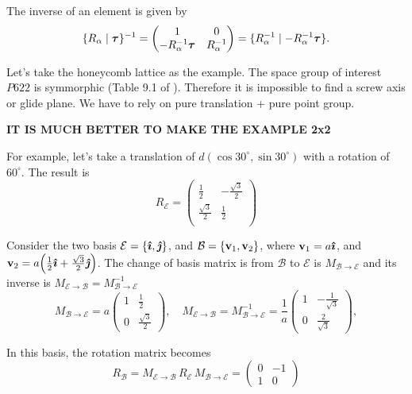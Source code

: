 The inverse of an element is given by
\begin{equation} \label{eq:inv-spacegroup}
\{ R_\alpha \mid {\bm{\tau}} \}^{-1} =
\begin{pmatrix}
1 & 0 \\
-R_\alpha^{-1}{\bm{\tau}} & R_\alpha^{-1}
\end{pmatrix} =
\{ R_\alpha^{-1} \mid -R_\alpha^{-1}{\bm{\tau}} \}.
\end{equation}

Let's take the honeycomb lattice as the example. The space group of interest $P622$ \cite{thesis_rennella} is symmorphic (Table 9.1 of \cite{dresselhaus}). Therefore it is impossible to find a screw axis or glide plane. We have to rely on pure translation + pure point group.

\textbf{IT IS MUCH BETTER TO MAKE THE EXAMPLE 2x2}

For example, let's take a translation of $d(\cos30^\circ, \sin30^\circ)$ with a rotation of $60^\circ$. The result is
$$
R_{\mathcal{E}} =
\begin{pmatrix}
\frac{1}{2} & -\frac{\sqrt{3}}{2} \\
\frac{\sqrt{3}}{2} & \frac{1}{2} \\
\end{pmatrix}
$$

Consider the two basis $\mathcal{E} = \{\bm{\hat{\imath}}, \bm{\hat{\jmath}}\}$, and $\mathcal{B} = \{{\vb{v}}_1, {\vb{v}}_2\}$, where ${\vb{v}}_1 = a \bm{\hat{\imath}}$, and ${\vb{v}}_2 = a \qty(\frac{1}{2}\bm{\hat{\imath}} + \frac{\sqrt{3}}{2} \bm{\hat{\jmath}})$. The change of basis matrix is from $\mathcal{B}$ to $\mathcal{E}$ is $M_{\mathcal{B}\to\mathcal{E}}$ and its inverse is $M_{\mathcal{E}\to\mathcal{B}} = M_{\mathcal{B}\to\mathcal{E}}^{-1}$
$$
M_{\mathcal{B} \to \mathcal{E}} =
a
\begin{pmatrix}
1 & \frac{1}{2} \\
0 & \frac{\sqrt{3}}{2}
\end{pmatrix},
\quad
M_{\mathcal{E} \to \mathcal{B}} = M_{\mathcal{B}\to\mathcal{E}}^{-1} =
\frac{1}{a}
\begin{pmatrix}
1 & -\frac{1}{\sqrt{3}} \\
0 & \frac{2}{\sqrt{3}}
\end{pmatrix},
$$

In this basis, the rotation matrix becomes
$$
R_{\mathcal{B}} =  M_{\mathcal{E} \to \mathcal{B}} \, R_{\mathcal{E}} \, M_{\mathcal{B}\to\mathcal{E}} =
\begin{pmatrix}
0 & -1 \\
1 &  0
\end{pmatrix}
$$

